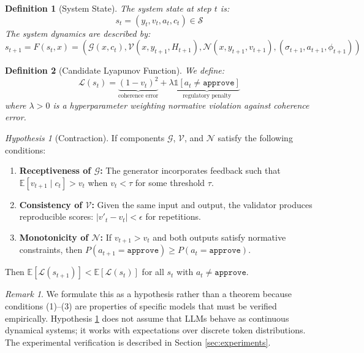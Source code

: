 \documentclass[11pt,a4paper]{article}
\newtheorem{definition}{Definition}[section]
\theoremstyle{remark}
\newtheorem{remark}{Remark}[section]
\newtheorem{hypothesis}{Hypothesis}[section]
\newcommand{\E}{\mathbb{E}}
\begin{document}
\begin{definition}[System State]
\label{def:state}
The system state at step $t$ is:
\begin{equation}
  s_t = (y_t, v_t, a_t, c_t) \in \mathcal{S}
\end{equation}
The system dynamics are described by:
\begin{equation}
  s_{t+1} = F(s_t, x) = \left(\mathcal{G}(x, c_t), \mathcal{V}(x, y_{t+1}, H_{t+1}), \mathcal{N}(x, y_{t+1}, v_{t+1}), (\sigma_{t+1}, a_{t+1}, \phi_{t+1})\right)
\end{equation}
\end{definition}

\begin{definition}[Candidate Lyapunov Function]
\label{def:lyapunov}
We define:
\begin{equation}
  \mathcal{L}(s_t) = \underbrace{(1 - v_t)^2}_{\text{coherence error}} + \lambda \underbrace{\mathbb{1}[a_t \neq \texttt{approve}]}_{\text{regulatory penalty}}
\end{equation}
where $\lambda > 0$ is a hyperparameter weighting normative violation against coherence error.
\end{definition}

\begin{hypothesis}[Contraction]
\label{hyp:contraction}
If components $\mathcal{G}$, $\mathcal{V}$, and $\mathcal{N}$ satisfy the following conditions:
\begin{enumerate}
  \item \textbf{Receptiveness of $\mathcal{G}$:} The generator incorporates feedback such that $\E[v_{t+1} \mid c_t] > v_t$ when $v_t < \tau$ for some threshold $\tau$.
  \item \textbf{Consistency of $\mathcal{V}$:} Given the same input and output, the validator produces reproducible scores: $|v'_t - v_t| < \epsilon$ for repetitions.
  \item \textbf{Monotonicity of $\mathcal{N}$:} If $v_{t+1} > v_t$ and both outputs satisfy normative constraints, then $P(a_{t+1} = \texttt{approve}) \geq P(a_t = \texttt{approve})$.
\end{enumerate}
Then $\E[\mathcal{L}(s_{t+1})] < \E[\mathcal{L}(s_t)]$ for all $s_t$ with $a_t \neq \texttt{approve}$.
\end{hypothesis}

\begin{remark}
\label{rem:hypothesis}
We formulate this as a hypothesis rather than a theorem because conditions (1)--(3) are properties of specific models that must be verified empirically. Hypothesis \ref{hyp:contraction} does not assume that LLMs behave as continuous dynamical systems; it works with expectations over discrete token distributions. The experimental verification is described in Section \ref{sec:experiments}.
\end{remark}
\end{document}
